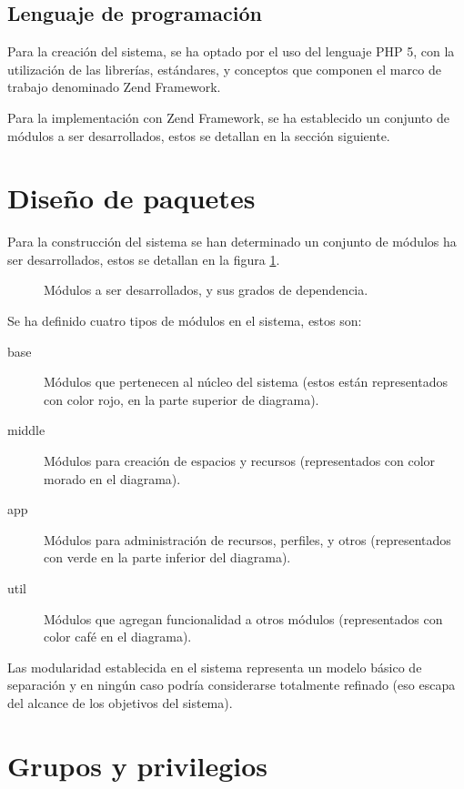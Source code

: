 \subsection{Lenguaje de programación}

Para la creación del sistema, se ha optado por el uso del lenguaje PHP 5, con la
utilización de las librerías, estándares, y conceptos  que componen el marco
de trabajo denominado Zend Framework.

Para la implementación con Zend Framework, se ha establecido un conjunto de
módulos a ser desarrollados, estos se detallan en la sección siguiente.

\section{Diseño de paquetes}

Para la construcción del sistema se han determinado un conjunto de módulos ha
ser desarrollados, estos se detallan en la figura \ref{paquetes}.

\begin{figure}
\centering

\caption{Módulos a ser desarrollados, y sus grados de dependencia.}
\label{paquetes}
\end{figure}

Se ha definido cuatro tipos de módulos en el sistema, estos son:

\begin{description}
\item [base] Módulos que pertenecen al núcleo del sistema (estos están
representados con color rojo, en la parte superior de diagrama).
\item [middle] Módulos para creación de espacios y recursos (representados con
color morado en el diagrama).
\item [app] Módulos para administración de recursos, perfiles, y otros
(representados con verde en la parte inferior del diagrama).
\item [util] Módulos que agregan funcionalidad a otros módulos (representados
con color café en el diagrama).
\end{description}

Las modularidad establecida en el sistema representa un modelo básico de
separación y en ningún caso podría considerarse totalmente refinado (eso escapa
del alcance de los objetivos del sistema).

\section{Grupos y privilegios}

